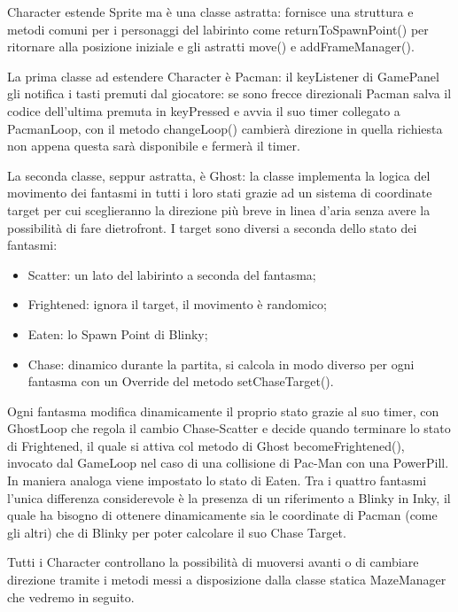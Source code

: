 \documentclass[12pt,a4paper]{report}
\begin{document}
Character estende Sprite ma è una classe astratta: fornisce una struttura e metodi comuni per i personaggi del labirinto come returnToSpawnPoint() per ritornare alla posizione iniziale e gli astratti move() e addFrameManager().

La prima classe ad estendere Character è Pacman: il keyListener di GamePanel gli notifica i tasti premuti dal giocatore: se sono frecce direzionali Pacman salva il codice dell’ultima premuta in keyPressed e avvia il suo timer collegato a PacmanLoop, con il metodo changeLoop() cambierà direzione in quella richiesta non appena questa sarà disponibile e fermerà il timer.

La seconda classe, seppur astratta, è Ghost: la classe implementa la logica del movimento dei fantasmi in tutti i loro stati grazie ad un sistema di coordinate target per cui sceglieranno la direzione più breve in linea d’aria senza avere la possibilità di fare dietrofront. I target sono diversi a seconda dello stato dei fantasmi:
\begin{itemize}
 \item Scatter: un lato del labirinto a seconda del fantasma;
 \item Frightened: ignora il target, il movimento è randomico;
 \item Eaten: lo Spawn Point di Blinky;
 \item Chase: dinamico durante la partita, si calcola in modo diverso per ogni fantasma con un Override del metodo setChaseTarget().
\end{itemize}
Ogni fantasma modifica dinamicamente il proprio stato grazie al suo timer, con GhostLoop che regola il cambio Chase-Scatter e decide quando terminare lo stato di Frightened, il quale si attiva col metodo di Ghost becomeFrightened(), invocato dal GameLoop nel caso di una collisione di Pac-Man con una PowerPill. In maniera analoga viene impostato lo stato di Eaten.
Tra i quattro fantasmi l’unica differenza considerevole è la presenza di un riferimento a Blinky in Inky, il quale ha bisogno di ottenere dinamicamente sia le coordinate di Pacman (come gli altri) che di Blinky per poter calcolare il suo Chase Target.

Tutti i Character controllano la possibilità di muoversi avanti o di cambiare direzione tramite i metodi messi a disposizione dalla classe statica MazeManager che vedremo in seguito.
\end{document}
